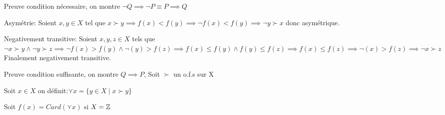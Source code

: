 \documentclass[a4paper, 12pt]{article}
\begin{document}
\begin{demonstration}
    Preuve condition nécessaire, on montre $\neg Q \implies \neg P \equiv P \implies Q$

    \item Asymétrie: Soient $x, y \in X$ tel que $x \succ y \implies f(x) \lt f(y) \implies \neg f(x) \lt f(y) \implies \neg y \succ x$ donc asymétrique.

    \item Negativement transitive: Soient $x, y, z \in X$ tels que $\neg x \succ y \land \neg y \succ z \implies \neg f(x) \gt f(y) \land \neg (y) \gt f(z) \implies f(x) \leq f(y) \land f(y) \leq f(z) \implies f(x) \leq f(z) \implies \neg (x) \gt f(z) \implies \neg x \succ z$
    Finalement negativement transitive.

    Preuve condition suffisante, on montre $Q \implies P$, Soit $\succ$ un o.f.s sur X

    Soit $x \in X$ on définit:$\curlyvee x = \{y \in X \mid x \succ y\}$
    
    Soit $f(x) = Card(\curlyvee x)$ si $X = \mathbb{Z}$
\end{demonstration}



\end{document}
